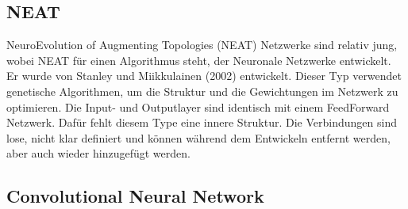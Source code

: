 \subsection{NEAT}

NeuroEvolution of Augmenting Topologies (NEAT) Netzwerke sind relativ jung, wobei NEAT für einen Algorithmus steht, der Neuronale Netzwerke entwickelt.
Er wurde von Stanley und Miikkulainen (2002) entwickelt. 
Dieser Typ verwendet genetische Algorithmen, um die Struktur und die Gewichtungen im Netzwerk zu optimieren.
Die Input- und Outputlayer sind identisch mit einem FeedForward Netzwerk.
Dafür fehlt diesem Type eine innere Struktur. 
Die Verbindungen sind lose, nicht klar definiert und können während dem Entwickeln entfernt werden, aber auch wieder hinzugefügt werden.





\subsection{Convolutional Neural Network}


